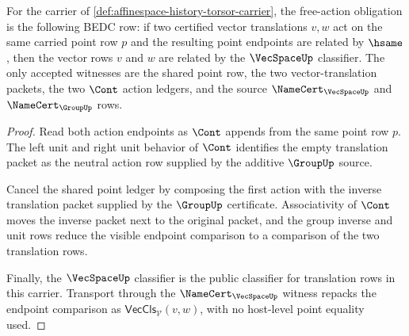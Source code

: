 \begin{theorem}
\label{thm:affinespace-free-action-obligation}
For the carrier of \autoref{def:affinespace-history-torsor-carrier}, the free-action obligation is the following BEDC row: if two certified vector translations $v,w$ act on the same carried point row $p$ and the resulting point endpoints are related by $\hsame$, then the vector rows $v$ and $w$ are related by the $\VecSpaceUp$ classifier. The only accepted witnesses are the shared point row, the two vector-translation packets, the two $\Cont$ action ledgers, and the source $\NameCert_{\VecSpaceUp}$ and $\NameCert_{\GroupUp}$ rows.
\end{theorem}
\begin{proof}
Read both action endpoints as $\Cont$ appends from the same point row $p$. The left unit and right unit behavior of $\Cont$ identifies the empty translation packet as the neutral action row supplied by the additive $\GroupUp$ source.

Cancel the shared point ledger by composing the first action with the inverse translation packet supplied by the $\GroupUp$ certificate. Associativity of $\Cont$ moves the inverse packet next to the original packet, and the group inverse and unit rows reduce the visible endpoint comparison to a comparison of the two translation rows.

Finally, the $\VecSpaceUp$ classifier is the public classifier for translation rows in this carrier. Transport through the $\NameCert_{\VecSpaceUp}$ witness repacks the endpoint comparison as $\mathsf{VecCls}_{\mathcal{V}}(v,w)$, with no host-level point equality used.
\end{proof}

